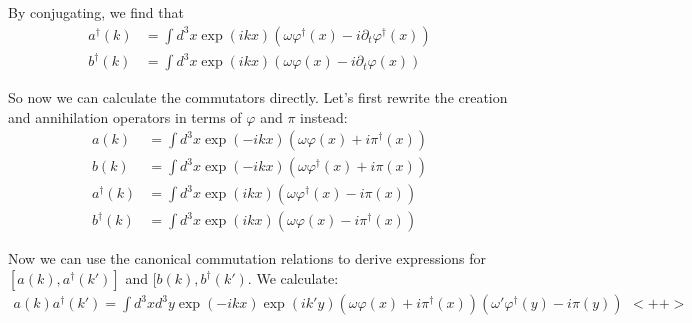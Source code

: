 \documentclass[fontsize=11pt]{scrartcl} %
\numberwithin{equation}{section} %
\numberwithin{figure}{section} %
\numberwithin{table}{section} %
\begin{document}
By conjugating, we find that
\[
    \begin{aligned}
        a^{\dagger}(k) &= \int d^3x\exp(ikx)\left( \omega\varphi^{\dagger}(x) -
        i\partial_t\varphi^{\dagger}(x)\right)\\
                b^{\dagger}(k) &= \int d^3x\exp(ikx)\left( \omega\varphi(x) -
                        i\partial_t\varphi(x)\right)
    \end{aligned}
\]

So now we can calculate the commutators directly. Let's first rewrite the
creation and annihilation operators in terms of $\varphi$ and $\pi$ instead:
\[
    \begin{aligned}
        a(k) &= \int d^3x\exp(-ikx)\left( \omega\varphi(x) 
        + i\pi^{\dagger}(x)\right)\\
        b(k) &= \int d^3x\exp(-ikx)\left( \omega\varphi^{\dagger}(x)
            + i\pi(x)\right)\\
        a^{\dagger}(k) &= \int d^3x\exp(ikx)\left( \omega\varphi^{\dagger}(x) -
            i\pi(x)\right)\\
        b^{\dagger}(k) &= \int d^3x\exp(ikx)\left( \omega\varphi(x) -
        i\pi^{\dagger}(x)\right)
    \end{aligned}
\]

Now we can use the canonical commutation relations to derive expressions for
$[a(k),a^{\dagger}(k')]$ and $[b(k),b^{\dagger}(k')$. We calculate:
\[
    \begin{aligned}
        a(k)a^{\dagger}(k') = \int d^3xd^3y\exp(-ikx)\exp(ik'y)\left( 
            \omega\varphi(x) + i\pi^{\dagger}(x)
        \right)
        \left( 
        \omega'\varphi^{\dagger}(y) -i\pi(y)\right)
    \end{aligned}<++>
\]
\end{document}
